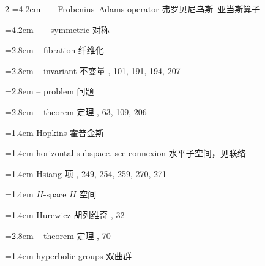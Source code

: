 \begin{multicols}{2}
\noindent\hangindent=4.2em -- -- Frobenius--Adams operator \quad 弗罗贝尼乌斯--亚当斯算子 \par
\noindent\hangindent=4.2em -- -- symmetric \quad 对称 \par
\noindent\hangindent=2.8em -- fibration \quad 纤维化 \par
\noindent\hangindent=2.8em -- invariant \quad 不变量 , 101, 191, 194, 207\par
\noindent\hangindent=2.8em -- problem \quad 问题 \par
\noindent\hangindent=2.8em -- theorem \quad 定理 , 63, 109, 206\par
\noindent\hangindent=1.4em Hopkins \quad 霍普金斯 \par
\noindent\hangindent=1.4em horizontal subspace, see connexion \quad 水平子空间，见联络 \quad\par
\noindent\hangindent=1.4em Hsiang \quad 项 , 249, 254, 259, 270, 271\par
\noindent\hangindent=1.4em $H$-space \quad $H$ 空间 \par
\noindent\hangindent=1.4em Hurewicz \quad 胡列维奇 , 32\par
\noindent\hangindent=2.8em -- theorem \quad 定理 , 70\par
\noindent\hangindent=1.4em hyperbolic groups \quad 双曲群 \par
\end{multicols}


